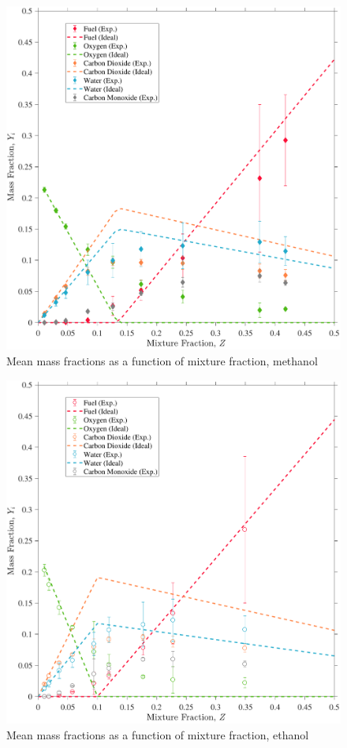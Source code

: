 \documentclass[12pt]{article}
\begin{document}
\begin{figure}[!]
	\centering
\includegraphics[width=\textwidth,keepaspectratio]{Adjusted_FuelMethanol_Mixture_Fraction_Intermediate_Plot.pdf}
	\caption[Mean mass fractions as a function of mixture fraction, methanol]{Mean mass fractions as a function of mixture fraction, methanol}
	\label{fig:Methanol_Mix_Frac}
\end{figure}

\begin{figure}[!]
	\centering
\includegraphics[width=\textwidth,keepaspectratio]{Adjusted_FuelEthanol_Mixture_Fraction_Intermediate_Plot.pdf}
	\caption[Mean mass fractions as a function of mixture fraction, ethanol]{Mean mass fractions as a function of mixture fraction, ethanol}
	\label{fig:Ethanol_Mix_Frac}
\end{figure}
\end{document}
